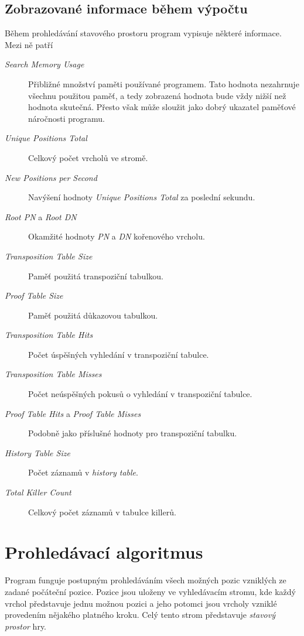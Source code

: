 \documentclass{article}
\begin{document}
\subsection{Zobrazované informace během výpočtu}
Během prohledávání stavového prostoru program vypisuje některé informace. Mezi
ně patří \begin{description}
\item[\emph{Search Memory Usage}] Přibližné množství paměti používané programem.
  Tato hodnota nezahrnuje všechnu použitou paměť, a tedy zobrazená hodnota bude 
  vždy nižší než hodnota skutečná. Přesto však může sloužit jako dobrý ukazatel 
  paměťové náročnosti programu.
\item[\emph{Unique Positions Total}] Celkový počet vrcholů ve stromě.
\item[\emph{New Positions per Second}] Navýšení hodnoty \emph{Unique Positions
  Total} za poslední sekundu.
\item[\emph{Root PN} a \emph{Root DN}] Okamžité hodnoty \emph{PN} a \emph{DN}
  kořenového vrcholu.
\item[\emph{Transposition Table Size}] Paměť použitá transpoziční tabulkou.
\item[\emph{Proof Table Size}] Paměť použitá důkazovou tabulkou.
\item[\emph{Transposition Table Hits}] Počet úspěšných vyhledání v transpoziční
  tabulce.
\item[\emph{Transposition Table Misses}] Počet neúspěšných pokusů o vyhledání v
  transpoziční tabulce.
\item[\emph{Proof Table Hits} a \emph{Proof Table Misses}] Podobně jako 
  příslušné hodnoty pro transpoziční tabulku.
\item[\emph{History Table Size}] Počet záznamů v \emph{history table}.
\item[\emph{Total Killer Count}] Celkový počet záznamů v tabulce killerů.
\end{description}

\section{Prohledávací algoritmus}
Program funguje postupným prohledáváním všech možných pozic vzniklých ze zadané
počáteční pozice. Pozice jsou uloženy ve vyhledávacím stromu, kde každý vrchol 
představuje jednu možnou pozici a jeho potomci jsou vrcholy vzniklé provedením
nějakého platného kroku. Celý tento strom představuje \emph{stavový prostor}
hry.
\end{document}
